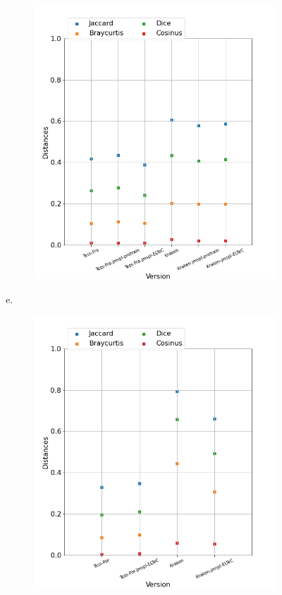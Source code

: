 \begin{figure}
\begin{minipage}{7cm}
\begin{subfigure}{0.99\textwidth}
  \includegraphics[height=.99\textwidth]{IMAGES/ELTeC_DISTANCES_spaCy3.5.1/ADAM-graph-dist-spaCy3.5.1-txt.png} 
  \vspace{-0.25cm}
  \label{fig:Adam_DIST_txt}
  \end{subfigure}
  \end{minipage}
\begin{minipage}{7cm}
e.\
  \begin{subfigure}{0.99\textwidth}
  \includegraphics[height=.99\textwidth]{IMAGES/ELTeC_DISTANCES_spaCy3.5.1/DINIZ-graph-dist-spaCy3.5.1-txt.png} 

\end{subfigure}
\end{minipage}
\end{figure}
